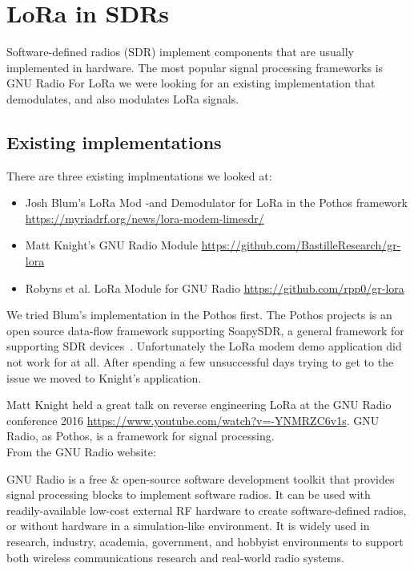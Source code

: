\chapter{LoRa in SDRs}
Software-defined radios (SDR) implement components that are usually implemented in hardware.
The most popular signal processing frameworks is GNU Radio
For LoRa we were looking for an existing implementation that demodulates, and also modulates LoRa signals.

\section{Existing implementations}
There are three existing implmentations we looked at:
\begin{itemize}
    \item Josh Blum's LoRa Mod -and Demodulator for LoRa in the Pothos framework \url{https://myriadrf.org/news/lora-modem-limesdr/}
    \item Matt Knight's GNU Radio Module \url{https://github.com/BastilleResearch/gr-lora}
    \item Robyns et al. LoRa Module for GNU Radio \url{https://github.com/rpp0/gr-lora}
\end{itemize}

We tried Blum's implementation in the Pothos  first. The Pothos projects is an open source data-flow framework
supporting SoapySDR, a general framework for supporting SDR devices~\cite{pothos}.
Unfortunately the LoRa modem demo application did not work for at all. After spending a few unsuccessful days 
trying to get to the issue we moved to Knight's application.

Matt Knight held a great talk on reverse engineering LoRa at the GNU Radio conference 2016 \url{https://www.youtube.com/watch?v=-YNMRZC6v1s}.
GNU Radio, as Pothos, is a framework for signal processing.\\
From the GNU Radio website:
\begin{displayquote}
    GNU Radio is a free \& open-source software development toolkit that provides signal processing
    blocks to implement software radios. It can be used with readily-available low-cost external
    RF hardware to create software-defined radios, or without hardware in a simulation-like environment.
    It is widely used in research, industry, academia, government, and hobbyist environments to support both wireless
    communications research and real-world radio systems.~\cite{gnuradio}
\end{displayquote}

